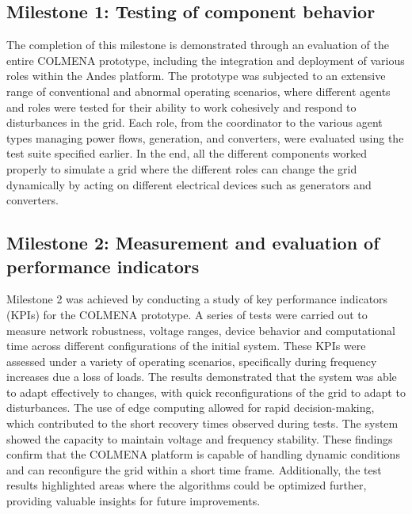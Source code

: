 \documentclass{article}
\begin{document}
\subsection*{Milestone 1: Testing of component behavior}

The completion of this milestone is demonstrated through an evaluation of the entire COLMENA prototype, including the integration and deployment of various roles within the Andes platform. The prototype was subjected to an extensive range of conventional and abnormal operating scenarios, where different agents and roles were tested for their ability to work cohesively and respond to disturbances in the grid. Each role, from the coordinator to the various agent types managing power flows, generation, and converters, were evaluated using the test suite specified earlier. In the end, all the different components worked properly to simulate a grid where the different roles can change the grid dynamically by acting on different electrical devices such as generators and converters.

\subsection*{Milestone 2: Measurement and evaluation of performance indicators}

Milestone 2 was achieved by conducting a study of key performance indicators (KPIs) for the COLMENA prototype. A series of tests were carried out to measure network robustness, voltage ranges, device behavior and computational time across different configurations of the initial system. These KPIs were assessed under a variety of operating scenarios, specifically during frequency increases due a loss of loads. The results demonstrated that the system was able to adapt effectively to changes, with quick reconfigurations of the grid to adapt to disturbances. The use of edge computing allowed for rapid decision-making, which contributed to the short recovery times observed during tests. The system showed the capacity to maintain voltage and frequency stability. These findings confirm that the COLMENA platform is capable of handling dynamic conditions and can reconfigure the grid within a short time frame. Additionally, the test results highlighted areas where the algorithms could be optimized further, providing valuable insights for future improvements.

\newpage
\clearpage
\nocite{*}  
\printbibliography
\end{document}
